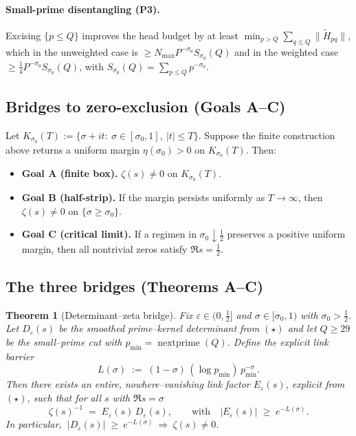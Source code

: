 \documentclass[11pt]{article}
\newtheorem{theorem}{Theorem}
\theoremstyle{definition}
\theoremstyle{remark}
\begin{document}
\paragraph{Small-prime disentangling (P3).}
Excising $\{p\le Q\}$ improves the head budget by at least $\min_{p>Q}\sum_{q\le Q}\|\widetilde H_{pq}\|$, which in the unweighted case is $\ge N_{\max} P^{-\sigma_0} S_{\sigma_0}(Q)$ and in the weighted case $\ge \tfrac14 P^{-\sigma_0} S_{\sigma_0}(Q)$, with $S_{\sigma_0}(Q)=\sum_{p\le Q}p^{-\sigma_0}$.

\subsection*{Bridges to zero-exclusion (Goals A--C)}
Let $K_{\sigma_0}(T):=\{\sigma+it:\ \sigma\in[\sigma_0,1],\ |t|\le T\}$. Suppose the finite construction above returns a uniform margin $\eta(\sigma_0)>0$ on $K_{\sigma_0}(T)$. Then:
\begin{itemize}
  \item \textbf{Goal A (finite box).} $\zeta(s)\ne 0$ on $K_{\sigma_0}(T)$.
  \item \textbf{Goal B (half-strip).} If the margin persists uniformly as $T\to\infty$, then $\zeta(s)\ne 0$ on $\{\sigma\ge\sigma_0\}$.
  \item \textbf{Goal C (critical limit).} If a regimen in $\sigma_0\downarrow\tfrac12$ preserves a positive uniform margin, then all nontrivial zeros satisfy $\Re s=\tfrac12$.
\end{itemize}

\subsection*{The three bridges (Theorems A--C)}

\begin{theorem}[Determinant--zeta bridge]\label{thm:det-zeta-bridge}
Fix $\varepsilon\in(0,\tfrac12]$ and $\sigma\in[\sigma_{0},1)$ with $\sigma_{0}>\tfrac12$. Let $D_{\varepsilon}(s)$ be the smoothed prime--kernel determinant from $(\star)$ and let $Q\ge 29$ be the small--prime cut with $p_{\min}=\operatorname{nextprime}(Q)$. Define the explicit link barrier
\[
   L(\sigma)\;:=\;(1-\sigma)\,(\log p_{\min})\,p_{\min}^{-\sigma}.
\]
Then there exists an entire, nowhere--vanishing link factor $E_{\varepsilon}(s)$, explicit from $(\star)$, such that for all $s$ with $\Re s=\sigma$
\[
  \zeta(s)^{-1}\;=\;E_{\varepsilon}(s)\,D_{\varepsilon}(s),
  \qquad
  \text{with}\quad |E_{\varepsilon}(s)|\;\ge\;e^{-L(\sigma)}.
\]
In particular, $\ |D_{\varepsilon}(s)| \;\ge\ e^{-L(\sigma)}\ \Longrightarrow\ \zeta(s)\neq 0$.
\end{theorem}
\end{document}
